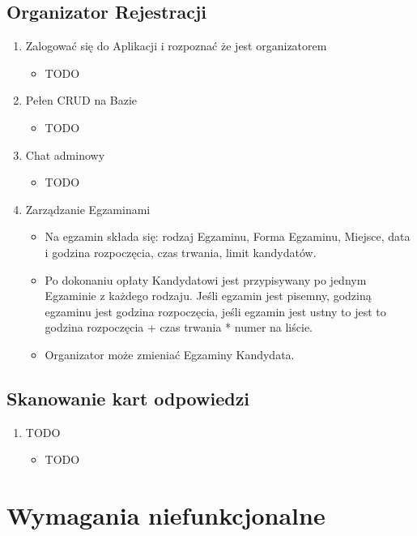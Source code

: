 \documentclass{article}
\begin{document}
\subsection{Organizator Rejestracji}
\begin{enumerate}
  \item Zalogować się do Aplikacji i rozpoznać że jest organizatorem
      \begin{itemize}
         \item TODO
       \end{itemize}
  \item Pełen CRUD na Bazie
      \begin{itemize}
         \item TODO
       \end{itemize}
  \item Chat adminowy
      \begin{itemize}
         \item TODO
       \end{itemize}
  \item Zarządzanie Egzaminami
      \begin{itemize}
         \item Na egzamin składa się: rodzaj Egzaminu, Forma Egzaminu, Miejsce, data i godzina rozpoczęcia, czas trwania, limit kandydatów.
         \item Po dokonaniu opłaty Kandydatowi jest przypisywany po jednym Egzaminie z każdego rodzaju. Jeśli egzamin jest pisemny, godziną egzaminu jest godzina rozpoczęcia, jeśli egzamin jest ustny to jest to  godzina rozpoczęcia + czas trwania * numer na liście.
         \item Organizator może zmieniać Egzaminy Kandydata.
       \end{itemize}
\end{enumerate}

\subsection{Skanowanie kart odpowiedzi}
\begin{enumerate}
  \item TODO
      \begin{itemize}
         \item TODO
       \end{itemize}
\end{enumerate}

\section{Wymagania niefunkcjonalne}
\end{document}
